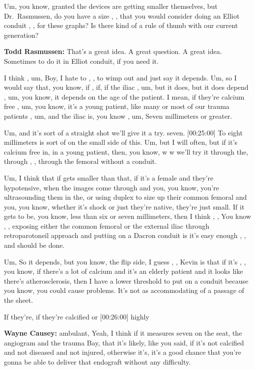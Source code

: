 \documentclass[
]{book}
\begin{document}
Um, you know, granted the devices are getting smaller themselves, but
Dr.~Rasmussen, do you have a size , , that you would consider doing an
Elliot conduit , , for these graphs? Is there kind of a rule of thumb
with our current generation?

\textbf{Todd Rasmussen:} That's a great idea. A great question. A great idea.
Sometimes to do it in Elliot conduit, if you need it.

I think , um, Boy, I hate to , , to wimp out and just say it depends.
Um, so I would say that, you know, if , if, if the iliac , um, but it
does, but it does depend , um, you know, it depends on the age of the
patient. I mean, if they're calcium free , um, you know, it's a young
patient, like many or most of our trauma patients , um, and the iliac
is, you know , um, Seven millimeters or greater.

Um, and it's sort of a straight shot we'll give it a try. seven.
{[}00:25:00{]} To eight millimeters is sort of on the small side of this.
Um, but I will often, but if it's calcium free in, in a young patient,
then, you know, w w we'll try it through the, through , , through the
femoral without a conduit.

Um, I think that if gets smaller than that, if it's a female and they're
hypotensive, when the images come through and you, you know, you're
ultrasounding them in the, or using duplex to size up their common
femoral and you, you know, whether it's shock or just they're native,
they're just small. If it gets to be, you know, less than six or seven
millimeters, then I think , , You know , , exposing either the common
femoral or the external iliac through retroparotoneil approach and
putting on a Dacron conduit is it's easy enough , , and should be done.

Um, So it depends, but you know, the flip side, I guess , , Kevin is
that if it's , , you know, if there's a lot of calcium and it's an
elderly patient and it looks like there's atherosclerosis, then I have a
lower threshold to put on a conduit because you know, you could cause
problems. It's not as accommodating of a passage of the sheet.

If they're, if they're calcified or {[}00:26:00{]} highly

\textbf{Wayne Causey:} ambulant, Yeah, I think if it measures seven on the
seat, the angiogram and the trauma Bay, that it's likely, like you said,
if it's not calcified and not diseased and not injured, otherwise it's,
it's a good chance that you're gonna be able to deliver that endograft
without any difficulty.
\end{document}
